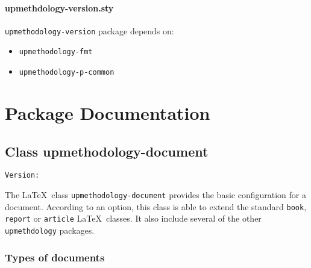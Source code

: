 \documentclass[book,taskpackage,specpackage,codepackage]{upmethodology-document}
\makeatletter
\let\VERdocclazz\upm@package@docclazz@ver
\makeatother
\begin{document}
\subsection{upmethdology-version.sty}

\texttt{upmethodology-version} package depends on:
\begin{itemize}
\item \texttt{upmethodology-fmt}
\item \texttt{upmethodology-p-common}
\end{itemize}


\part{Package Documentation}

\chapter{Class upmethodology-document}

\begin{center}
	\texttt{Version: \VERdocclazz}
\end{center}

The \LaTeX\ class \texttt{upmethodology-document} provides the basic configuration for a document. According to an option, this class is able to extend the standard \texttt{book}, \texttt{report} or \texttt{article} \LaTeX\ classes. It also include several of the other \texttt{upmethdology} packages.

\section{Types of documents}\label{section:documentclass:doctype}
\end{document}
